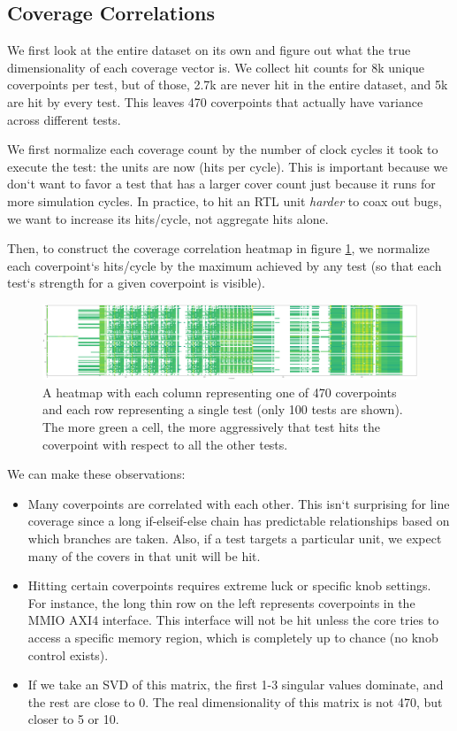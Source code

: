 \documentclass[sigconf,noacm]{acmart}
\begin{document}
\subsection{Coverage Correlations}

We first look at the entire dataset on its own and figure out what the true dimensionality of each coverage vector is.
We collect hit counts for 8k unique coverpoints per test, but of those, 2.7k are never hit in the entire dataset, and 5k are hit by every test.
This leaves 470 coverpoints that actually have variance across different tests.

We first normalize each coverage count by the number of clock cycles it took to execute the test: the units are now (hits per cycle).
This is important because we don`t want to favor a test that has a larger cover count just because it runs for more simulation cycles.
In practice, to hit an RTL unit \textit{harder} to coax out bugs, we want to increase its hits/cycle, not aggregate hits alone.

Then, to construct the coverage correlation heatmap in figure \ref{fig:cov_heatmap}, we normalize each coverpoint`s hits/cycle by the maximum achieved by any test (so that each test`s strength for a given coverpoint is visible).

\begin{figure}
  \includegraphics[width=\linewidth]{figs/cov_heatmap.png}
  \caption{A heatmap with each column representing one of 470 coverpoints and each row representing a single test (only 100 tests are shown). The more green a cell, the more aggressively that test hits the coverpoint with respect to all the other tests.}
  \label{fig:cov_heatmap}
\end{figure}

We can make these observations:

\begin{itemize}
  \item Many coverpoints are correlated with each other. This isn`t surprising for line coverage since a long if-elseif-else chain has predictable relationships based on which branches are taken. Also, if a test targets a particular unit, we expect many of the covers in that unit will be hit.
  \item Hitting certain coverpoints requires extreme luck or specific knob settings. For instance, the long thin row on the left represents coverpoints in the MMIO AXI4 interface. This interface will not be hit unless the core tries to access a specific memory region, which is completely up to chance (no knob control exists).
  \item If we take an SVD of this matrix, the first 1-3 singular values dominate, and the rest are close to 0. The real dimensionality of this matrix is not 470, but closer to 5 or 10.
\end{itemize}
\end{document}
